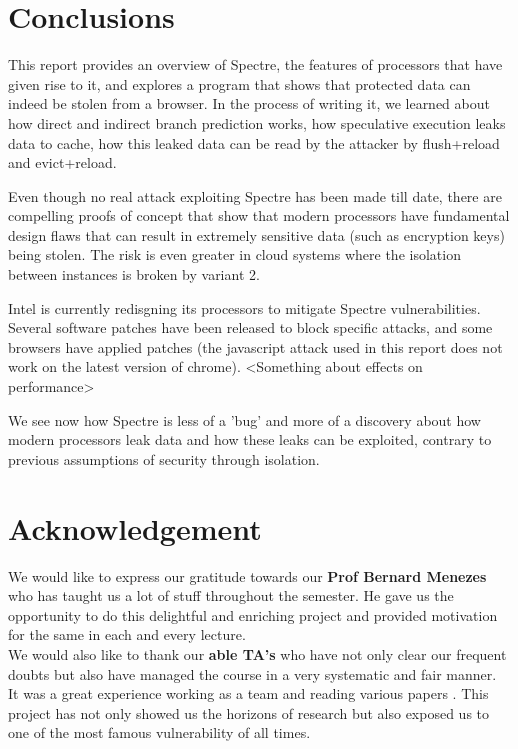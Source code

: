 \documentclass[12pt]{article}
\begin{document}
\section{Conclusions}
This report provides an overview of Spectre, the features of processors that have given rise to it, and explores a program that shows that protected data can indeed be stolen from a browser. In the process of writing it, we learned about how direct and indirect branch prediction works, how speculative execution leaks data to cache, how this leaked data can be read by the attacker by flush+reload and evict+reload.

Even though no real attack exploiting Spectre has been made till date, there are compelling proofs of concept that show that modern processors have fundamental design flaws that can result in extremely sensitive data (such as encryption keys) being stolen. The risk is even greater in cloud systems where the isolation between instances is broken by variant 2. 

Intel is currently redisgning its processors to mitigate Spectre vulnerabilities. Several software patches have been released to block specific attacks, and some browsers have applied patches (the javascript attack used in this report does not work on the latest version of chrome). <Something about effects on performance>

We see now how Spectre is less of a 'bug' and more of a discovery about how modern processors leak data and how these leaks can be exploited, contrary to previous assumptions of security through isolation.

\section{Acknowledgement}
We would like to express our gratitude towards our \textbf{Prof Bernard Menezes} who has taught us a lot of stuff throughout the semester. He gave us the opportunity to do this delightful and enriching project and provided motivation for the same in each and every lecture.\\

We would also like to thank our \textbf{able TA's} who have not only clear our frequent doubts but also have managed the course in a very systematic and fair manner.\\

It was a great experience working as a team and reading various papers . This project has not only showed us the horizons of research but also exposed us to one of the most famous vulnerability of all times.
  
\end{document}
